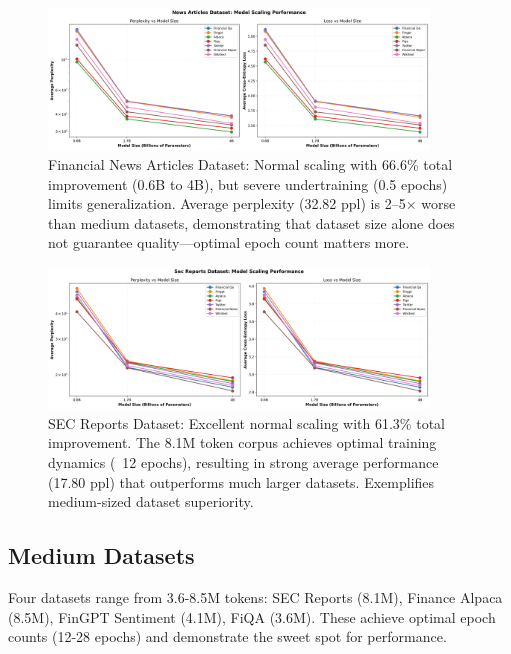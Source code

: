 \begin{figure}[h]
\centering
\includegraphics[width=0.9\textwidth]{figures/scaling_news_articles.png}
\caption[Financial News Dataset: Scaling Behavior]{Financial News Articles Dataset: Normal scaling with 66.6\% total improvement (0.6B to 4B), but severe undertraining (0.5 epochs) limits generalization. Average perplexity (32.82 ppl) is 2–5$\times$ worse than medium datasets, demonstrating that dataset size alone does not guarantee quality—optimal epoch count matters more.}
\label{fig:scaling_news_articles}
\end{figure}

\begin{figure}[h]
\centering
\includegraphics[width=0.9\textwidth]{figures/scaling_sec_reports.png}
\caption[SEC Reports Dataset: Scaling Behavior]{SEC Reports Dataset: Excellent normal scaling with 61.3\% total improvement. The 8.1M token corpus achieves optimal training dynamics (~12 epochs), resulting in strong average performance (17.80 ppl) that outperforms much larger datasets. Exemplifies medium-sized dataset superiority.}
\label{fig:scaling_sec_reports}
\end{figure}





\subsection{Medium Datasets}

Four datasets range from 3.6-8.5M tokens: SEC Reports (8.1M), Finance Alpaca (8.5M), FinGPT Sentiment (4.1M), FiQA (3.6M). These achieve optimal epoch counts (12-28 epochs) and demonstrate the sweet spot for performance.

